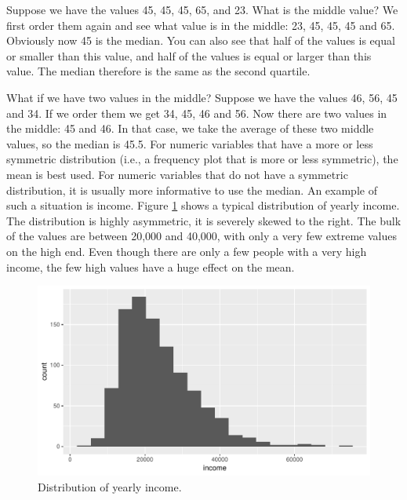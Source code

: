 \documentclass[]{report}\usepackage[]{graphicx}\usepackage[]{color}
\makeatletter
\def\maxwidth{ %
  \ifdim\Gin@nat@width>\linewidth
    \linewidth
  \else
    \Gin@nat@width
  \fi
}
\makeatother
\begin{document}
Suppose we have the values 45, 45, 45, 65, and 23. What is the middle value? We first order them again and see what value is in the middle: 23, 45, 45, 45 and 65. Obviously now 45 is the median. You can also see that half of the values is equal or smaller than this value, and half of the values is equal or larger than this value. The median therefore is the same as the second quartile.

What if we have two values in the middle? Suppose we have the values 46, 56, 45 and 34. If we order them we get 34, 45, 46 and 56. Now there are two values in the middle: 45 and 46. In that case, we take the average of these two middle values, so the median is 45.5. For numeric variables that have a more or less symmetric distribution (i.e., a frequency plot that is more or less symmetric), the mean is best used. For numeric variables that do not have a symmetric distribution, it is usually more informative to use the median. An example of such a situation is income. Figure \ref{fig:median} shows a typical distribution of yearly income. The distribution is highly asymmetric, it is severely skewed to the right. The bulk of the values are between 20,000 and 40,000, with only a very few extreme values on the high end. Even though there are only a few people with a very high income, the few high values have a huge effect on the mean.

\begin{figure}

{\centering \includegraphics[width=\maxwidth]{figure/median-1} 

}

\caption[Distribution of yearly income]{Distribution of yearly income.}\label{fig:median}
\end{figure}
\end{document}
